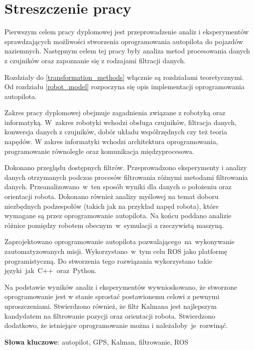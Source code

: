 \section*{Streszczenie pracy}
{
    Pierwszym celem pracy dyplomowej jest przeprowadzenie analiz i eksperymentów sprawdzających możliwości stworzenia oprogramowania autopilota do pojazdów naziemnych. Następnym celem tej pracy były analiza metod procesowania danych z czujników oraz zapoznanie się z rodzajami filtracji danych.

    Rozdziały do \ref{transformation_methods} włącznie są rozdziałami teoretycznymi. Od rozdziału \ref{robot_model} rozpoczyna się opis implementacji oprogramowania autopilota.

    Zakres pracy dyplomowej obejmuje zagadnienia związane z robotyką oraz informatyką. W~zakres robotyki wchodzi obsługa czujników, filtracja danych, konwersja danych z czujników, dobór układu współrzędnych czy też teoria napędów. W zakres informatyki wchodzi architektura oprogramowania, programowanie równoległe oraz komunikacja międzyprocesowa.
    
    Dokonano przeglądu dostępnych filtrów. Przeprowadzono eksperymenty i analizy danych otrzymanych podczas procesów filtrowania różnymi metodami filtrowania danych. Przeanalizowano~w~ten sposób wyniki dla danych o położeniu oraz orientacji robota. Dokonano również analizy myślowej na temat doboru niezbędnych podzespołów (takich jak na przykład napęd robota), które wymagane są przez oprogramowanie autopilota. Na końcu poddano analizie różnice pomiędzy robotem obecnym~w~symulacji a rzeczywistą maszyną.

    Zaprojektowano oprogramowanie autopilota pozwalającego~na~wykonywanie zautomatyzowanych misji. Wykorzystano~w~tym celu ROS jako platformę programistyczną. Do stworzenia tego rozwiązania wykorzystano takie języki~jak~C++~oraz~Python.
    
    Na podstawie wyników analiz i eksperymentów wywnioskowano, że stworzone oprogramowanie jest w stanie sprostać postawionemu celowi z pewnymi uproszczeniami.
    Stwierdzono również, że filtr Kalmana jest najlepszym kandydatem na filtrowanie pozycji oraz orientacji robota. Stwierdzono dodatkowo, że istniejące oprogramowanie można i należałoby~je~rozwinąć.
    
    
    \textbf{Słowa kluczowe}: autopilot, GPS, Kalman, filtrowanie, ROS
}